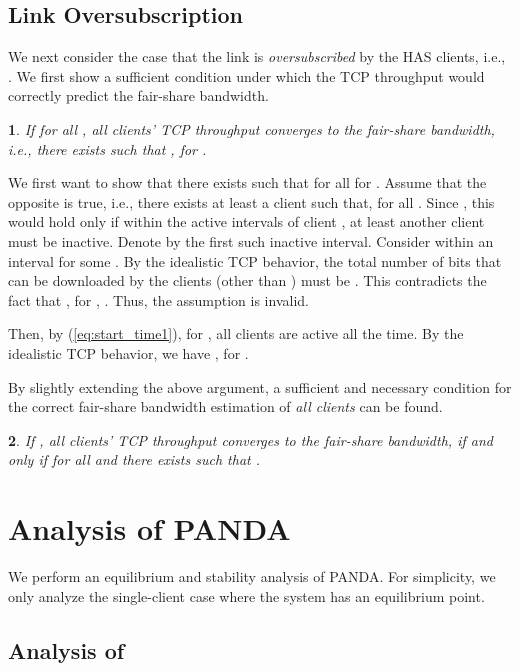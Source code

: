 \documentclass[conference]{IEEEtran}
\theoremstyle{plain}
\newtheorem{thm}{\protect\theoremname}
\theoremstyle{definition}
\theoremstyle{plain}
\theoremstyle{plain}
\providecommand{\theoremname}{Theorem}
\begin{document}
\subsection{Link Oversubscription}

We next consider the case that the link is \emph{oversubscribed} by
the  HAS clients, i.e., . We first show
a sufficient condition under which the TCP throughput would correctly
predict the fair-share bandwidth.
\begin{thm}
\label{thm:oversubscribed2}If  for all ,
all clients' TCP throughput converges to the fair-share bandwidth,
i.e., there exists  such that ,
 for .\end{thm}
\begin{IEEEproof}
We first want to show that there exists  such that 
for all  for . Assume that the opposite is
true, i.e., there exists at least a client  such that, 
for all . Since , this would hold
only if within the active intervals of client , at least another
client  must be inactive. Denote by 
the first such inactive interval. Consider within an interval 
for some . By the idealistic TCP behavior, the total
number of bits that can be downloaded by the  clients (other
than ) must be . This contradicts
the fact that , for , .
Thus, the assumption is invalid.

Then, by (\ref{eq:start_time1}), for , all clients are
active all the time. By the idealistic TCP behavior, we have ,
 for .
\end{IEEEproof}
By slightly extending the above argument, a sufficient and necessary
condition for the correct fair-share bandwidth estimation of \emph{all
clients} can be found.
\begin{thm}
\label{thm:oversubscribed3}If , all clients'
TCP throughput converges to the fair-share bandwidth, if and only
if  for all  and there exists 
such that .
\end{thm}

\section{Analysis of PANDA\label{sec:Analysis-of-PANDA}}

We perform an equilibrium and stability analysis of PANDA. For simplicity,
we only analyze the single-client case where the system has an equilibrium
point.


\subsection{Analysis of }
\end{document}
